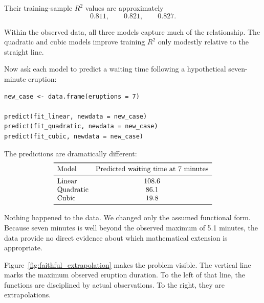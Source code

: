 \documentclass[11pt]{report}
\begin{document}
Their training-sample \(R^2\) values are approximately
\[
0.811,\qquad 0.821,\qquad 0.827.
\]

Within the observed data, all three models capture much of the relationship. The quadratic and cubic models improve training \(R^2\) only modestly relative to the straight line.

Now ask each model to predict a waiting time following a hypothetical seven-minute eruption:

\begin{lstlisting}
new_case <- data.frame(eruptions = 7)

predict(fit_linear, newdata = new_case)
predict(fit_quadratic, newdata = new_case)
predict(fit_cubic, newdata = new_case)
\end{lstlisting}

The predictions are dramatically different:
\[
\begin{array}{lcc}
\toprule
\text{Model} & \text{Predicted waiting time at 7 minutes} \\
\midrule
\text{Linear} & 108.6 \\
\text{Quadratic} & 86.1 \\
\text{Cubic} & 19.8 \\
\bottomrule
\end{array}
\]

Nothing happened to the data. We changed only the assumed functional form. Because seven minutes is well beyond the observed maximum of 5.1 minutes, the data provide no direct evidence about which mathematical extension is appropriate.

Figure~\ref{fig:faithful_extrapolation} makes the problem visible. The vertical line marks the maximum observed eruption duration. To the left of that line, the functions are disciplined by actual observations. To the right, they are extrapolations.
\end{document}
